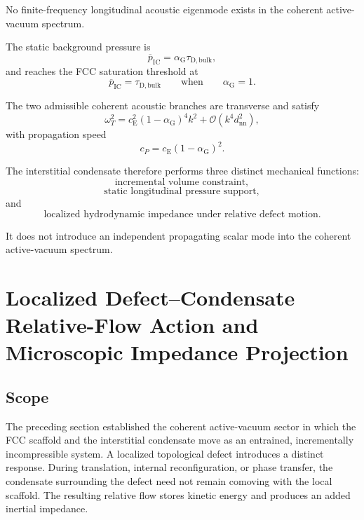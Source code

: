 No finite-frequency longitudinal acoustic eigenmode exists in the coherent active-vacuum spectrum.

The static background pressure is
\begin{equation}
    \boxed{ \overline{p}_{\mathrm{IC}} = \alpha_{\mathrm{G}} \tau_{\mathrm{D,bulk}} },
\end{equation}
and reaches the FCC saturation threshold at
\begin{equation}
    \boxed{ \overline{p}_{\mathrm{IC}} = \tau_{\mathrm{D,bulk}} \qquad \text{when} \qquad \alpha_{\mathrm{G}} = 1 }.
\end{equation}

The two admissible coherent acoustic branches are transverse and satisfy
\begin{equation}
    \boxed{ \omega_T^2 = c_{\mathrm{E}}^2 \left( 1-\alpha_{\mathrm{G}} \right)^4 k^2 + \mathcal{O}\left( k^4d_{\mathrm{nn}}^2 \right) },
\end{equation}
with propagation speed
\begin{equation}
    \boxed{ c_P = c_{\mathrm{E}} \left( 1-\alpha_{\mathrm{G}} \right)^2 }.
\end{equation}

The interstitial condensate therefore performs three distinct mechanical functions:
\begin{equation}
    \boxed{ \text{incremental volume constraint} },
\end{equation}
\begin{equation}
    \boxed{ \text{static longitudinal pressure support} },
\end{equation}
and
\begin{equation}
    \boxed{ \text{localized hydrodynamic impedance under relative defect motion} }.
\end{equation}

It does not introduce an independent propagating scalar mode into the coherent active-vacuum spectrum.

\section{Localized Defect--Condensate Relative-Flow Action and Microscopic Impedance Projection}

\subsection{Scope}

The preceding section established the coherent active-vacuum sector in which the FCC scaffold and the interstitial condensate move as an entrained, incrementally incompressible system. A localized topological defect introduces a distinct response. During translation, internal reconfiguration, or phase transfer, the condensate surrounding the defect need not remain comoving with the local scaffold. The resulting relative flow stores kinetic energy and produces an added inertial impedance.

